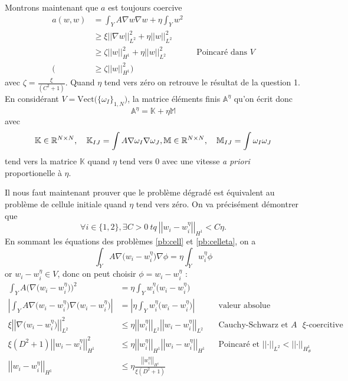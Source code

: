 \documentclass[11pt]{article}
\newcommand{\Am}{\mathbb{A}}
\newcommand{\R}{\mathbb{R}}
\newcommand{\K}{\mathbb{K}}
\newcommand{\M}{\mathbb{M}}
\newcommand{\norm}[1]{\left|\left|#1\right|\right|}
\newcommand{\Hd}{H^1_{\#}}
\begin{document}
Montrons maintenant que $a$ est toujours coercive
\begin{align*}
  a(w,w) &= \int_Y A \nabla w  \nabla w + \eta \int_Y w^2 \\
         &\geq \xi \norm{\nabla w}^2_{L^2} + \eta \norm{w}^2_{L^2} \\
         &\geq \zeta \norm{w}^2_{H^1} + \eta \norm{ w}^2_{L^2} && \text{Poincaré dans }V\\
    \big(&\geq \zeta  \norm{w}^2_{H^1}\big)
\end{align*} 
avec $\zeta = \frac{\xi}{(C^2+1)}$. Quand $\eta$ tend vers zéro on retrouve le résultat de la question 1. En considérant $V = \text{Vect}\big(\{\omega_I\}_{1,N})$, la matrice éléments finis $\Am^{\eta}$ qu'on écrit donc
\[
  \Am^{\eta} = \K + \eta \M 
\]
avec
\[
  \K \in \R^{N\times N},\quad \K_{IJ} = \int A \nabla \omega_I \nabla \omega_J,  \\
  \M \in \R^{N\times N},\quad \M_{IJ} = \int \omega_I \omega_J
\]
tend vers la matrice $\K$ quand $\eta$ tend vers $0$ avec une vitesse \emph{a priori} proportionelle à $\eta$.

Il nous faut maintenant prouver que le problème dégradé est équivalent au problème de cellule initiale quand $\eta$ tend vers zéro. On va précisément démontrer
que
\[
  \forall i \in \{1,2\}, \exists C>0 ~tq~ \norm{w_i-w_i^\eta}_{H^1} < C \eta.
\]
En sommant les équations des problèmes \autoref{pb:cell} et \autoref{pb:celleta}, on a
\[
  \int_Y A \nabla \big(w_i-w_i^\eta\big) \nabla \phi = \eta \int_Y w_i^\eta \phi
\]
or $w_i-w_i^\eta\in V$, donc on peut choisir $\phi=w_i-w_i^\eta$ :
\begin{align*}
  \int_Y A \big(\nabla \big(w_i-w_i^\eta\big)\big)^2
  &= \eta \int_Y w_i^\eta \big(w_i-w_i^\eta\big) \\
  \left| \int_Y A \nabla \big(w_i-w_i^\eta\big) \nabla \big(w_i-w_i^\eta\big) \right|
  &= \left| \eta \int_Y w_i^\eta \big(w_i-w_i^\eta\big) \right| && \text{valeur absolue} \\
  \xi \norm{\nabla \big(w_i-w_i^\eta \big)}_{L^2}^2
  &\leq \eta \norm{w_i^\eta}_{L^2} \norm{w_i-w_i^\eta}_{L^2} && \text{Cauchy-Schwarz et $A$ $\xi$-coercitive} \\
  \xi (D^2+1) \norm{w_i-w_i^\eta }_{H^1}^2 &\leq \eta \norm{w_i^\eta}_{H^1} \norm{w_i-w_i^\eta }_{H^1} && \text{Poincaré et }\norm{\cdot}_{L^2}<\norm{\cdot}_{\Hd} \\
  \norm{w_i-w_i^\eta }_{H^1} &\leq \eta \frac{\norm{w_i^\eta}_{H^1}}{\xi (D^2+1)}
\end{align*}
\end{document}

